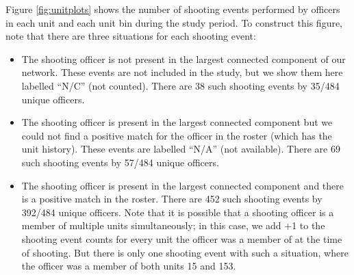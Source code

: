 Figure \ref{fig:unitplots} shows the number of shooting events
performed by officers in each unit and each unit bin during the study
period. To construct this figure, note that there are three
situations for each shooting event:
\begin{itemize}
\item The shooting officer is not present in the largest connected component of our network. 
These events are not included in the study, but we show them here labelled
``N/C'' (not counted). There are 38 such shooting events by 35/484 unique officers.
\item The shooting officer is present in the largest connected component but we could
not find a positive match for the officer in the roster (which has the unit history). 
These events are labelled ``N/A'' (not available). There are 69 such shooting events
by 57/484 unique officers.
\item The shooting officer is present in the largest connected component and there is
a positive match in the roster. There are 452 such shooting events by 392/484 unique officers.
Note that it is possible that a shooting officer is a member of multiple units simultaneously;
in this case, we add +1 to the shooting event counts for every unit the officer was a member of
at the time of shooting. But there is only one shooting event with such a situation, %
where the officer was a member of both units 15 and 153.
\end{itemize}

